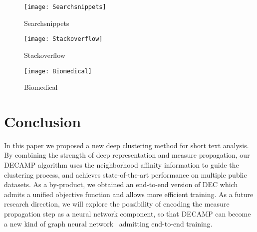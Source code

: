 \documentclass[letterpaper]{article}
\begin{document}
\begin{figure}
  \centering
      \texttt{[image: Searchsnippets]}
  \caption{Searchsnippets}
\end{figure}   

\begin{figure}
  \centering
      \texttt{[image: Stackoverflow]}
  \caption{Stackoverflow}
\end{figure}   

\begin{figure}
  \centering
      \texttt{[image: Biomedical]}
  \caption{Biomedical}
\end{figure} 


\section{Conclusion}
In this paper we proposed a new deep clustering method for short text analysis. By combining the strength of deep representation and measure propagation, our DECAMP algorithm uses the neighborhood affinity information to guide the clustering process, and achieves state-of-the-art performance on multiple public datasets. As a by-product, we obtained an end-to-end version of DEC which admits a unified objective function and allows more efficient training. As a future research direction, we will explore the possibility of encoding the measure propagation step as a neural network component, so that DECAMP can become a new kind of graph neural network~\cite{gnn} admitting end-to-end training.



\end{document}

